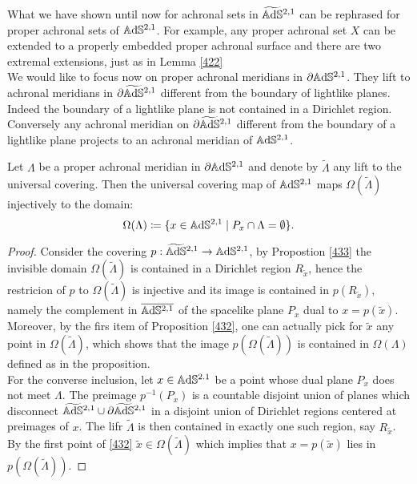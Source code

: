 What we have shown until now for achronal sets in $\widetilde{\mathbb{A}\mathrm{d}\mathbb{S}}{}^{2,1}$ can be rephrased for proper achronal sets of $\mathbb{A}\mathrm{d}\mathbb{S}^{2,1}$. For example, any proper achronal set $X$ can be extended to a properly embedded proper achronal surface and there are two extremal extensions, just as in Lemma \ref{422}\\
We would like to focus now on proper achronal meridians in $\partial\mathbb{A}\mathrm{d}\mathbb{S}^{2,1}$. They lift to achronal meridians in $\partial\widetilde{\mathbb{A}\mathrm{d}\mathbb{S}}{}^{2,1}$ different from the boundary of lightlike planes. Indeed the boundary of a lightlike plane is not contained in a Dirichlet region. Conversely any achronal meridian on $\partial\widetilde{\mathbb{A}\mathrm{d}\mathbb{S}}{}^{2,1}$ different from the boundary of a lightlike plane projects to an achronal meridian of $\mathbb{A}\mathrm{d}\mathbb{S}^{2,1}$.

\begin{proposition}\label{453}
    Let $\Lambda$ be a proper achronal meridian in $\partial\mathbb{A}\mathrm{d}\mathbb{S}^{2,1}$ and denote by $\widetilde{\Lambda}$ any lift to the universal covering. Then the universal covering map of $\mathbb{A}\mathrm{d}\mathbb{S}^{2,1}$ maps $\Omega(\widetilde{\Lambda})$ injectively to the domain: 
    \[
        \Omega(\Lambda)\coloneqq \{x\in\mathbb{A}\mathrm{d}\mathbb{S}^{2,1}\;|\;P_x\cap\Lambda=\emptyset\}.
    \]
\end{proposition}
    
\begin{proof}
Consider the covering $p:\widetilde{\mathbb{A}\mathrm{d}\mathbb{S}}{}^{2,1}\to \mathbb{A}\mathrm{d}\mathbb{S}^{2,1}$, by Propostion \ref{433} the invisible domain $\Omega(\widetilde{\Lambda})$ is contained in a Dirichlet region $R_{\widetilde{x}}$, hence the restricion of $p$ to $\Omega(\widetilde{\Lambda})$ is injective and its image is contained in $p(R_{\widetilde{x}}),$ namely the complement in $\overline{\mathbb{A}\mathrm{d}\mathbb{S}^{2,1}}$ of the spacelike plane $P_x$ dual to $x=p(\widetilde{x})$. Moreover, by the firs item of Proposition \ref{432}, one can actually pick for $\widetilde{x}$ any point in $\Omega(\widetilde{\Lambda})$, which shows that the image $p(\Omega(\widetilde{\Lambda}))$ is contained in $\Omega(\Lambda)$ defined as in the proposition. \\ 
For the converse inclusion, let $x\in\mathbb{A}\mathrm{d}\mathbb{S}^{2.1}$ be a point whose dual plane $P_x$ does not meet $\Lambda$. The preimage $p^{-1}(P_x)$ is a countable disjoint union of planes which disconnect $\widetilde{\mathbb{A}\mathrm{d}\mathbb{S}}{}^{2,1}\cup \partial\widetilde{\mathbb{A}\mathrm{d}\mathbb{S}}{}^{2,1}$ in a disjoint union of Dirichlet regions centered at preimages of $x$. The lifr $\widetilde{\Lambda}$ is then contained in exactly one such region, say $R_{\widetilde{x}}$. By the first point of \ref{432} $\widetilde{x}\in\Omega(\widetilde{\Lambda})$ which implies that   $x=p(\widetilde{x})$ lies in $p(\Omega(\widetilde{\Lambda}))$. 
\end{proof}


